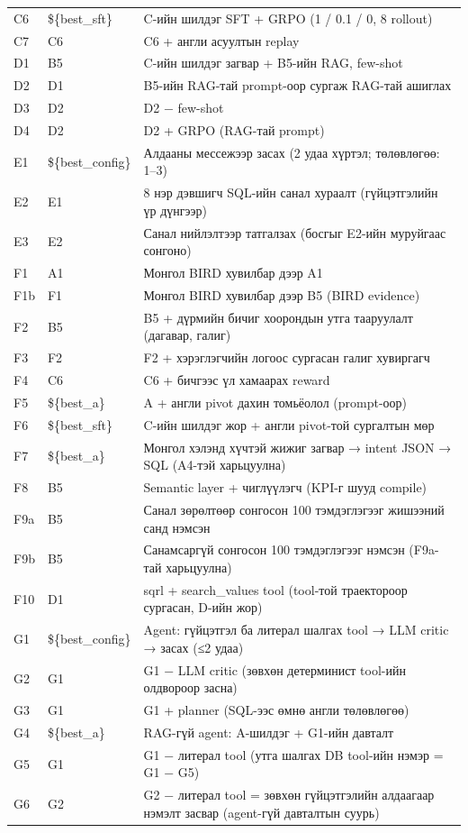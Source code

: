 \begin{small}
\begin{longtable}{p{1.0cm}p{2.6cm}p{9.6cm}}
C6 & \$\{best\_sft\} & C-ийн шилдэг SFT + GRPO (1 / 0.1 / 0, 8 rollout) \\
C7 & C6 & C6 + англи асуултын replay \\
D1 & B5 & C-ийн шилдэг загвар + B5-ийн RAG, few-shot \\
D2 & D1 & B5-ийн RAG-тай prompt-оор сургаж RAG-тай ашиглах \\
D3 & D2 & D2 − few-shot \\
D4 & D2 & D2 + GRPO (RAG-тай prompt) \\
E1 & \$\{best\_config\} & Алдааны мессежээр засах (2 удаа хүртэл; төлөвлөгөө: 1–3) \\
E2 & E1 & 8 нэр дэвшигч SQL-ийн санал хураалт (гүйцэтгэлийн үр дүнгээр) \\
E3 & E2 & Санал нийлэлтээр татгалзах (босгыг E2-ийн муруйгаас сонгоно) \\
F1 & A1 & Монгол BIRD хувилбар дээр A1 \\
F1b & F1 & Монгол BIRD хувилбар дээр B5 (BIRD evidence) \\
F2 & B5 & B5 + дүрмийн бичиг хоорондын утга тааруулалт (дагавар, галиг) \\
F3 & F2 & F2 + хэрэглэгчийн логоос сургасан галиг хувиргагч \\
F4 & C6 & C6 + бичгээс үл хамаарах reward \\
F5 & \$\{best\_a\} & A + англи pivot дахин томьёолол (prompt-оор) \\
F6 & \$\{best\_sft\} & C-ийн шилдэг жор + англи pivot-той сургалтын мөр \\
F7 & \$\{best\_a\} & Монгол хэлэнд хүчтэй жижиг загвар → intent JSON → SQL (A4-тэй харьцуулна) \\
F8 & B5 & Semantic layer + чиглүүлэгч (KPI-г шууд compile) \\
F9a & B5 & Санал зөрөлтөөр сонгосон 100 тэмдэглэгээг жишээний санд нэмсэн \\
F9b & B5 & Санамсаргүй сонгосон 100 тэмдэглэгээг нэмсэн (F9a-тай харьцуулна) \\
F10 & D1 & sqrl + search\_values tool (tool-той траектороор сургасан, D-ийн жор) \\
G1 & \$\{best\_config\} & Agent: гүйцэтгэл ба литерал шалгах tool → LLM critic → засах (≤2 удаа) \\
G2 & G1 & G1 − LLM critic (зөвхөн детерминист tool-ийн олдвороор засна) \\
G3 & G1 & G1 + planner (SQL-ээс өмнө англи төлөвлөгөө) \\
G4 & \$\{best\_a\} & RAG-гүй agent: A-шилдэг + G1-ийн давталт \\
G5 & G1 & G1 − литерал tool (утга шалгах DB tool-ийн нэмэр = G1 − G5) \\
G6 & G2 & G2 − литерал tool = зөвхөн гүйцэтгэлийн алдаагаар нэмэлт засвар (agent-гүй давталтын суурь) \\
\bottomrule
\end{longtable}
\end{small}
